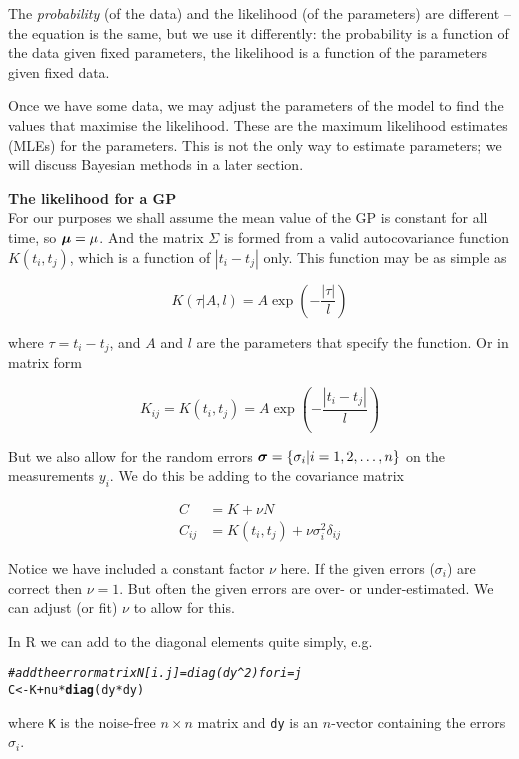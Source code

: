 \documentclass[a4paper, 11pt, amsmath, graphicx]{article}\usepackage[]{graphicx}\usepackage[]{color}
\makeatletter
\newcommand{\hlcom}[1]{\textcolor[rgb]{0.678,0.584,0.686}{\textit{#1}}}%
\newcommand{\hlopt}[1]{\textcolor[rgb]{0,0,0}{#1}}%
\newcommand{\hlstd}[1]{\textcolor[rgb]{0.345,0.345,0.345}{#1}}%
\newcommand{\hlkwb}[1]{\textcolor[rgb]{0.69,0.353,0.396}{#1}}%
\newcommand{\hlkwd}[1]{\textcolor[rgb]{0.737,0.353,0.396}{\textbf{#1}}}%
\newenvironment{kframe}{%
 \def\at@end@of@kframe{}%
 \ifinner\ifhmode%
  \def\at@end@of@kframe{\end{minipage}}%
  \begin{minipage}{\columnwidth}%
 \fi\fi%
 \def\FrameCommand##1{\hskip\@totalleftmargin \hskip-\fboxsep
 \colorbox{shadecolor}{##1}\hskip-\fboxsep
     \hskip-\linewidth \hskip-\@totalleftmargin \hskip\columnwidth}%
 \MakeFramed {\advance\hsize-\width
   \@totalleftmargin\z@ \linewidth\hsize
   \@setminipage}}%
 {\par\unskip\endMakeFramed%
 \at@end@of@kframe}
\newenvironment{knitrout}{}{} %
\def\bmu{{\mbox{\boldmath $\mu$}}}
\def\bs{{\mbox{\boldmath $\sigma$}}}
\makeatother
\begin{document}
The \emph{probability} (of the data) and the likelihood (of the parameters) are  different -- the equation is the same, but we use it differently: the probability is a function of the data given fixed parameters, the likelihood is a function of the parameters given fixed data. 

Once we have some data, we may adjust the parameters of the model to find the values that maximise the likelihood. These are the maximum likelihood estimates (MLEs) for the parameters. This is not the only way to estimate parameters; we will discuss Bayesian methods in a later section.

\vspace{0.4cm}
\textbf{The likelihood for a GP}
\\

For our purposes we shall assume the mean value of the GP is constant for all time, so $\bmu = \mu$. And the matrix $\Sigma$ is formed from a valid autocovariance function $K(t_i, t_j)$, which is a function of $|t_i - t_j|$ only. This function may be as simple as

\begin{equation}
\label{eqn:OU}
  K(\tau|A, l) = A \exp \left( - \frac{|\tau|}{l} \right)
\end{equation}

where $\tau = t_i - t_j$, and $A$ and $l$ are the parameters that specify the function. Or in matrix form

\begin{equation}
\label{eqn:OU}
  K_{ij} = K(t_i, t_j) = A \exp \left( - \frac{|t_i - t_j|}{l} \right)
\end{equation}

But we also allow for the random errors $\bs = \{\sigma_i|i=1,2,\ldots,n\}$ on the measurements $y_i$. We do this be adding to the covariance matrix

\begin{align}
  C & = K + \nu N \nonumber \\
  C_{ij} & = K(t_i, t_j) + \nu \sigma_i^2 \delta_{ij}
\end{align}

Notice we have included a constant factor $\nu$ here. If the given errors ($\sigma_i$) are correct then $\nu =1$. But often the given errors are over- or under-estimated. We can adjust (or fit) $\nu$ to allow for this.

In R we can add to the diagonal elements quite simply, e.g.
\begin{knitrout}
\color{fgcolor}\begin{kframe}
\begin{alltt}
  \hlcom{# add the error matrix N[i.j] = diag(dy^2) for i=j}
  \hlstd{C} \hlkwb{<-} \hlstd{K} \hlopt{+} \hlstd{nu} \hlopt{*} \hlkwd{diag}\hlstd{(dy}\hlopt{*}\hlstd{dy)}
\end{alltt}
\end{kframe}
\end{knitrout}
where {\tt K} is the noise-free $n \times n$ matrix and {\tt dy} is an $n$-vector containing the errors $\sigma_i$. 
\end{document}
